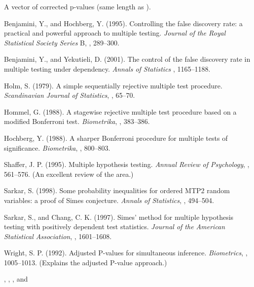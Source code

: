 \documentclass[a4paper]{book}
\begin{document}
%
\begin{Value}
A vector of corrected p-values (same length as ).
\end{Value}
%
\begin{References}\relax
Benjamini, Y., and Hochberg, Y. (1995).
Controlling the false discovery rate: a practical and powerful
approach to multiple testing.
\emph{Journal of the Royal Statistical Society Series} B, ,
289--300.

Benjamini, Y., and Yekutieli, D. (2001).
The control of the false discovery rate in multiple testing under
dependency.
\emph{Annals of Statistics} , 1165--1188.

Holm, S. (1979).
A simple sequentially rejective multiple test procedure.
\emph{Scandinavian Journal of Statistics}, , 65--70.

Hommel, G. (1988).
A stagewise rejective multiple test procedure based on a modified
Bonferroni test.
\emph{Biometrika}, , 383--386.

Hochberg, Y. (1988).
A sharper Bonferroni procedure for multiple tests of significance.
\emph{Biometrika}, , 800--803.

Shaffer, J. P. (1995).
Multiple hypothesis testing.
\emph{Annual Review of Psychology}, , 561--576.
(An excellent review of the area.)

Sarkar, S. (1998).
Some probability inequalities for ordered MTP2 random variables: a
proof of Simes conjecture.
\emph{Annals of Statistics}, , 494--504.

Sarkar, S., and Chang, C. K. (1997).
Simes' method for multiple hypothesis testing with positively
dependent test statistics.
\emph{Journal of the American Statistical Association}, ,
1601--1608.

Wright, S. P. (1992).
Adjusted P-values for simultaneous inference.
\emph{Biometrics}, , 1005--1013.
(Explains the adjusted P-value approach.)
\end{References}
%
\begin{SeeAlso}\relax
{}, , ,  and 
\end{SeeAlso}
%
\end{document}
